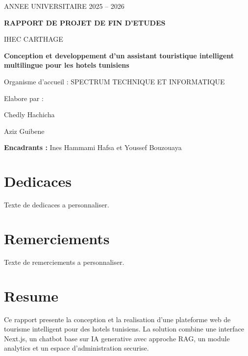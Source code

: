 \documentclass[12pt,a4paper,oneside]{report}
\begin{document}
\begin{titlepage}
  \centering
  {\Large ANNEE UNIVERSITAIRE 2025 -- 2026\par}
  \vspace{1.5cm}
  {\Huge\bfseries RAPPORT DE PROJET DE FIN D'ETUDES\par}
  \vspace{1cm}
  {\Large IHEC CARTHAGE\par}
  \vspace{1.5cm}
  {\LARGE\bfseries Conception et developpement d'un assistant touristique intelligent multilingue pour les hotels tunisiens\par}
  \vspace{1.5cm}
  {\large Organisme d'accueil : SPECTRUM TECHNIQUE ET INFORMATIQUE\par}
  \vspace{1cm}
  {\large Elabore par :\par}
  {\large Chedly Hachicha\par}
  {\large Aziz Guibene\par}
  \vfill
  \begin{flushleft}
    \textbf{Encadrants :} Ines Hammami Hafsa et Youssef Bouzouaya
  \end{flushleft}
\end{titlepage}


\chapter*{Dedicaces}
Texte de dedicaces a personnaliser.

\chapter*{Remerciements}
Texte de remerciements a personnaliser.

\chapter*{Resume}
Ce rapport presente la conception et la realisation d'une plateforme web de tourisme intelligent pour des hotels tunisiens. La solution combine une interface Next.js, un chatbot base sur IA generative avec approche RAG, un module analytics et un espace d'administration securise.
\end{document}

